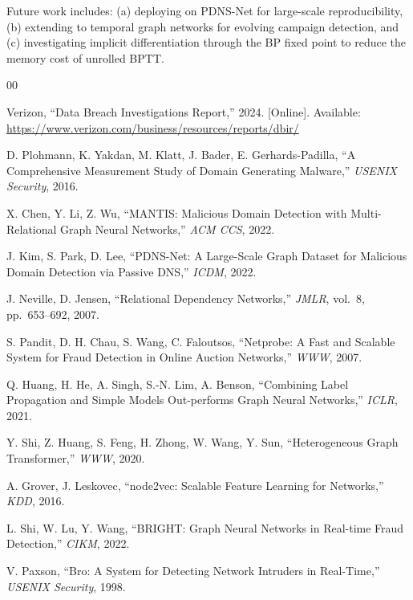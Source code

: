 \documentclass[conference]{IEEEtran}
\begin{document}
Future work includes: (a) deploying on PDNS-Net for large-scale reproducibility,
(b) extending to temporal graph networks for evolving campaign detection, and
(c) investigating implicit differentiation through the BP fixed point to reduce
the memory cost of unrolled BPTT.


\begin{thebibliography}{00}

Verizon, ``Data Breach Investigations Report,'' 2024. [Online].
Available: \url{https://www.verizon.com/business/resources/reports/dbir/}

D. Plohmann, K. Yakdan, M. Klatt, J. Bader, E. Gerhards-Padilla,
``A Comprehensive Measurement Study of Domain Generating Malware,''
\textit{USENIX Security}, 2016.

X. Chen, Y. Li, Z. Wu, ``MANTIS: Malicious Domain Detection with
Multi-Relational Graph Neural Networks,'' \textit{ACM CCS}, 2022.

J. Kim, S. Park, D. Lee, ``PDNS-Net: A Large-Scale Graph Dataset for
Malicious Domain Detection via Passive DNS,'' \textit{ICDM}, 2022.

J. Neville, D. Jensen, ``Relational Dependency Networks,''
\textit{JMLR}, vol.~8, pp.~653--692, 2007.

S. Pandit, D. H. Chau, S. Wang, C. Faloutsos, ``Netprobe: A Fast and
Scalable System for Fraud Detection in Online Auction Networks,''
\textit{WWW}, 2007.

Q. Huang, H. He, A. Singh, S.-N. Lim, A. Benson,
``Combining Label Propagation and Simple Models Out-performs Graph Neural Networks,''
\textit{ICLR}, 2021.

Y. Shi, Z. Huang, S. Feng, H. Zhong, W. Wang, Y. Sun,
``Heterogeneous Graph Transformer,'' \textit{WWW}, 2020.

A. Grover, J. Leskovec, ``node2vec: Scalable Feature Learning for Networks,''
\textit{KDD}, 2016.

L. Shi, W. Lu, Y. Wang, ``BRIGHT: Graph Neural Networks in Real-time Fraud
Detection,'' \textit{CIKM}, 2022.

V. Paxson, ``Bro: A System for Detecting Network Intruders in Real-Time,''
\textit{USENIX Security}, 1998.


\end{thebibliography}
\end{document}
